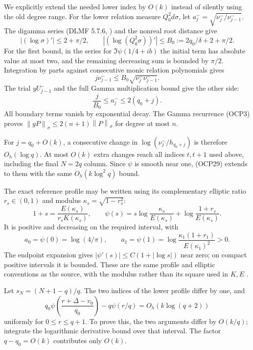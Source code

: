 \documentclass[11pt]{article}
\newcommand{\norm}[1]{\left\lVert#1\right\rVert}
\begin{document}
We explicitly extend the needed lower index by $O(k)$ instead of silently using the old degree range. For the lower relation measure $Q_0^2d\sigma$, let $a_j^-=\sqrt{\nu_j^-/\nu_{j-1}^-}$. The digamma series (DLMF 5.7.6, \cite{dlmfgamma}) and the nonreal root distance give
\[
 |(\log\sigma)'|\le2+\pi/2,\qquad
 |(\log(Q_0^2\sigma))'|\le B_0:=2q_0/\delta+2+\pi/2.
\]
For the first bound, in the series for $\Im\psi(1/4+ib)$ the initial term has absolute value at most two, and the remaining decreasing sum is bounded by $\pi/2$. Integration by parts against consecutive monic relation polynomials gives
\[
 j\nu_{j-1}^-\le B_0\sqrt{\nu_j^-\nu_{j-1}^-}.
\]
The trial $yU_{j-1}^-$ and the full Gamma multiplication bound give the other side:
\[
 \boxed{\frac j{B_0}\le a_j^-\le2(q_0+j).}
 \tag{OCP30}
\]
All boundary terms vanish by exponential decay. The Gamma recurrence (OCP3) proves $\norm{yP}_\sigma\le2(n+1)\norm P_\sigma$ for degree at most $n$.

For $j=q_0+O(k)$, a consecutive change in
$\log(\nu_j^-/h_{q_0+j})$ is therefore $O_h(\log q)$. At most $O(k)$ extra changes reach all indices $t,t+1$ used above, including the final $N=2q$ column. Since $\psi$ is smooth near one, (OCP29) extends to them with the same $O_h(k\log^2q)$ bound.

The exact reference profile may be written using its complementary elliptic ratio $r_s\in(0,1)$ and modulus $\kappa_s=\sqrt{1-r_s^2}$:
\[
 1+s=\frac{E(\kappa_s)}{r_sK(\kappa_s)},\qquad
 \psi(s)=s\log\frac{\kappa_s}{E(\kappa_s)}
 +\log\frac{1+r_s}{E(\kappa_s)}.
 \tag{OCP31}
\]
It is positive and decreasing on the required interval, with
\[
 a_0=\psi(0)=\log(4/\pi),\qquad
 a_1=\psi(1)=\log\frac{\kappa_1(1+r_1)}{E(\kappa_1)^2}>0.
\]
The endpoint expansion gives $|\psi'(s)|\le C(1+|\log s|)$ near zero; on compact positive intervals it is bounded. These are the same profile and elliptic conventions as the source, with the modulus rather than its square used in $K,E$ \cite{dlmfell,heat}.

Let $s_N=(N+1-q)/q$. The two indices of the lower profile differ by one, and
\[
 q_0\psi\left(\frac{r+\Delta-v_0}{q_0}\right)
 -q\psi(r/q)=O_h(k\log(q+2))
 \tag{OCP32}
\]
uniformly for $0\le r\le q+1$. To prove this, the two arguments differ by $O(k/q)$; integrate the logarithmic derivative bound over that interval. The factor $q-q_0=O(k)$ contributes only $O(k)$.
\end{document}
